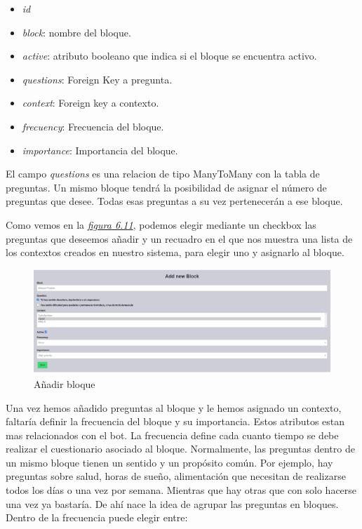 \begin{itemize}
    \item \textit{id}
    \item \textit{block}: nombre del bloque.
    \item \textit{active}: atributo booleano que indica si el bloque se encuentra activo.
    \item \textit{questions}: Foreign Key a pregunta.
    \item \textit{context}: Foreign key a contexto.
    \item \textit{frecuency}: Frecuencia del bloque.
    \item \textit{importance}: Importancia del bloque.
\end{itemize}\vspace{0.3cm}

El campo \textit{questions} es una relacion de tipo ManyToMany con la tabla de preguntas. Un mismo bloque tendrá la posibilidad de asignar el número de preguntas que desee. Todas esas preguntas a su vez pertenecerán a ese bloque.  

Como vemos en la \textit{\hyperref[fig:add-bloque]{figura 6.11}}, podemos elegir mediante un checkbox las preguntas que deseemos añadir y un recuadro en el que nos muestra una lista de los contextos creados en nuestro sistema, para elegir uno y asignarlo al bloque. \vspace{1cm}


\begin{figure}[!ht]
    \centering
    \includegraphics[width=1\textwidth]{imagenes/add_block.png}
    \caption{Añadir bloque}
    \label{fig:add-bloque}
\end{figure}\vspace{1cm}

Una vez hemos añadido preguntas al bloque y le hemos asignado un contexto, faltaría definir la frecuencia del bloque y su importancia. Estos atributos estan mas relacionados con el bot. La frecuencia define cada cuanto tiempo se debe realizar el cuestionario asociado al bloque. Normalmente, las preguntas dentro de un mismo bloque tienen un sentido y un propósito común. Por ejemplo, hay preguntas sobre salud, horas de sueño, alimentación que necesitan de realizarse todos los días o una vez por semana. Mientras que hay otras que con solo hacerse una vez ya bastaría. De ahí nace la idea de agrupar las preguntas en bloques. Dentro de la frecuencia puede elegir entre:

